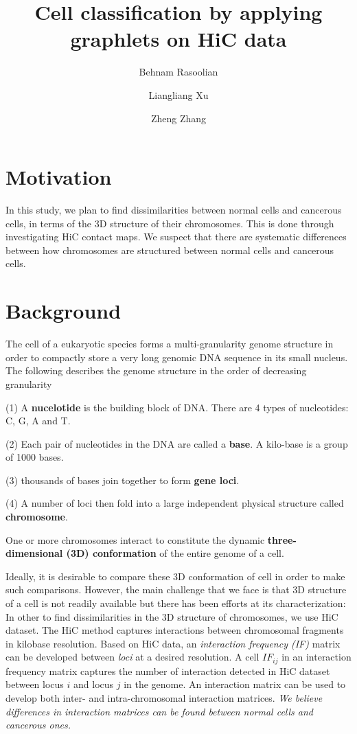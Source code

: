 \documentclass{article}
\title{Cell classification by applying graphlets on HiC data}
\author{Behnam Rasoolian  \and Liangliang Xu \and Zheng Zhang}
\date{}
\begin{document}
\fontsize{11pt}{13pt}\selectfont
{}
\setlength{\parindent}{0pt}
\maketitle
\section{Motivation}
In this study, we plan to find dissimilarities between normal cells and cancerous cells,
in terms of the 3D structure of their chromosomes. This is done through
investigating HiC contact maps. 
We suspect that there are systematic differences between how chromosomes are structured
between normal cells and cancerous cells.
\section{Background}
The cell of a eukaryotic species forms a multi-granularity genome structure
in order to compactly store a very long genomic 
DNA sequence in its small nucleus. The following describes the genome
structure in the order of decreasing granularity
\begin{enumerate*}
    \item[(1)] A \textbf{nucelotide} is the building block of
        DNA. There are 4 types of nucleotides: 
        C, G, A and T. 
    \item[(2)] Each pair of nucleotides in the DNA are called a \textbf{base}.
        A kilo-base is a group of 1000 bases.
    \item[(3)] thousands of bases join together to form \textbf{gene loci}.
    \item[(4)] A number of loci then fold into a large
        independent physical structure called \textbf{chromosome}.
\end{enumerate*}

One or more chromosomes interact to constitute the dynamic
\textbf{three-dimensional (3D) conformation} of the entire genome of a cell. 

Ideally, it is desirable to compare these 3D conformation of 
cell in order to make such comparisons.
However, the main challenge that we face is that 
3D structure of a cell is not readily available but there has been
efforts at its characterization:
In other to find dissimilarities in the 3D structure of 
chromosomes, we use HiC dataset.
The HiC method
captures interactions between 
chromosomal fragments in kilobase resolution. Based on HiC data, an
\textit{interaction frequency (IF) } matrix can be developed between \textit{loci} at a desired resolution.
A cell ${IF}_{ij}$ in an interaction frequency matrix captures the number of interaction detected
in HiC dataset between locus $i$ and locus $j$ in the genome.
An interaction matrix can be used to develop both inter- and intra-chromosomal interaction matrices.
\textit{We believe differences in interaction matrices can be found between normal cells and cancerous ones.}
\end{document}
